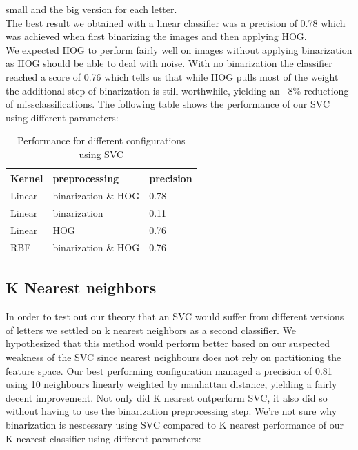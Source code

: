\documentclass[paper=a4, fontsize=11pt]{scrartcl} %
\numberwithin{equation}{section} %
\numberwithin{figure}{section} %
\numberwithin{table}{section} %
\begin{document}
small and the big version for each letter.\\  The best result we
obtained with a linear classifier was a precision of 0.78 which was
achieved when first binarizing the images and then applying HOG.\\
We expected HOG to perform fairly well on images without
applying binarization as HOG should be able to deal with noise.  With
no binarization the classifier reached a score of 0.76 which tells us
that while HOG pulls most of the weight the additional step of
binarization is still worthwhile, yielding an ~8\% reductiong of
missclassifications.  The following table shows the performance of our
SVC using different parameters:
\begin{table}[H]
    \centering
    \begin{tabular}{l | l | l}
        Kernel & preprocessing & precision\\ \hline
        Linear & binarization \& HOG & 0.78 \\ \hline
        Linear & binarization & 0.11 \\ \hline
        Linear & HOG & 0.76\\ \hline
        RBF & binarization \& HOG & 0.76\\
    \end{tabular}
    \caption{Performance for different configurations using SVC}
\end{table}

\subsection{K Nearest neighbors}
In order to test out our theory that an SVC would suffer from
different versions of letters we settled on k nearest neighbors as a
second classifier.  We hypothesized that this method would perform
better based on our suspected weakness of the SVC since nearest
neighbours does not rely on partitioning the feature space.  Our best
performing configuration managed a precision of 0.81 using 10
neighbours linearly weighted by manhattan distance, yielding a fairly
decent improvement.  Not only did K nearest outperform SVC, it also
did so without having to use the binarization preprocessing step.
We're not sure why binarization is nescessary using SVC compared to K
nearest %
performance of our K nearest classifier using different parameters:
\end{document}
